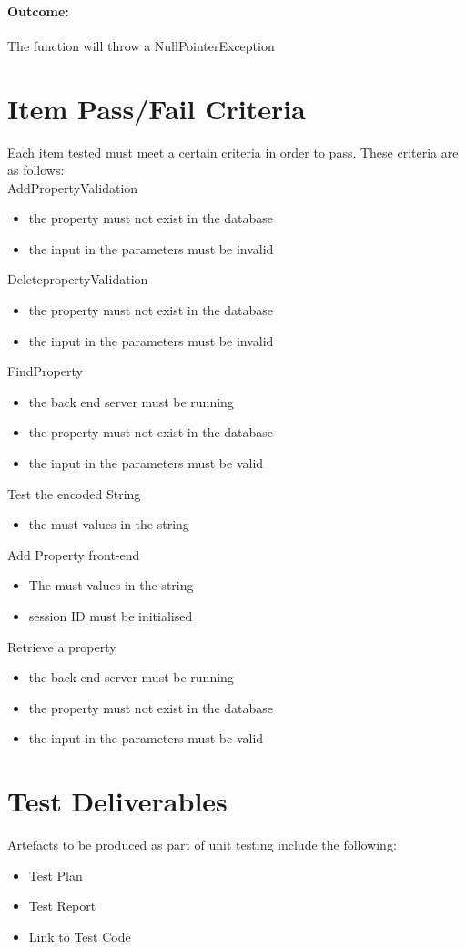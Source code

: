 \documentclass[a4paper,12pt]{article}
\begin{document}
\paragraph{Outcome: } The function will throw a NullPointerException


\section{Item Pass/Fail Criteria}
Each item tested must meet a certain criteria in order to pass. These criteria are as follows:\\

AddPropertyValidation
\begin{itemize}
 \item the property must not exist in the database
 \item the input in the parameters must be invalid
\end{itemize}
DeletepropertyValidation
\begin{itemize}
 \item the property must not exist in the database
 \item the input in the parameters must be invalid
\end{itemize}
FindProperty
\begin{itemize}
 \item the back end server must be running
 \item the property must not exist in the database
 \item the input in the parameters must be valid
\end{itemize}
Test the encoded String 
\begin{itemize}
 \item the must values in the string
\end{itemize}
Add Property front-end 
\begin{itemize}
 \item The must values in the string
 \item session ID must be initialised
\end{itemize}
Retrieve a property
\begin{itemize}
 \item the back end server must be running
 \item the property must not exist in the database
 \item the input in the parameters must be valid
\end{itemize}
\section{Test Deliverables}
Artefacts to be produced as part of unit testing include the following:
\begin{itemize}
\item Test Plan
\item Test Report
\item Link to Test Code
\end{itemize}
\end{document}
